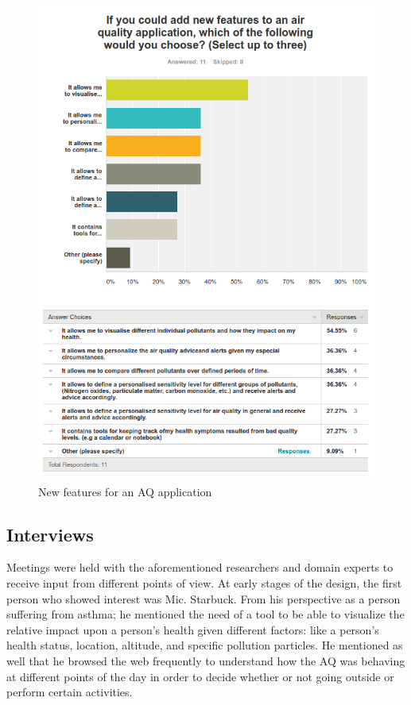 \begin{figure}[H]
\begin{adjustbox}{width=1\textwidth,center=\textwidth}
  \centering
  \includegraphics[scale=1]{images/new_features.png}
\end{adjustbox}
  \caption[New features for an AQ application]{New features for an AQ application}
  \label{fig:survey_new_features}
\end{figure}

\subsection{Interviews}

Meetings were held with the aforementioned researchers and domain experts to receive input from different points of view. At early stages of the design, the first person who showed interest was Mic. Starbuck. From his perspective as a person suffering from asthma; he mentioned the need of a tool to be able to visualize the relative impact upon a person's health given different factors: like a person's health status, location, altitude, and specific pollution particles. He mentioned as well that he browsed the web frequently to understand how the AQ was behaving at different points of the day in order to decide whether or not going outside or perform certain activities. 

